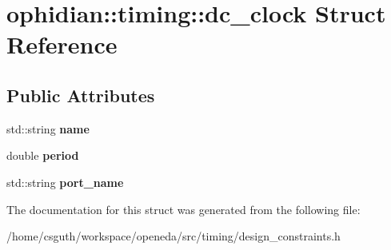 \hypertarget{structophidian_1_1timing_1_1dc__clock}{\section{ophidian\-:\-:timing\-:\-:dc\-\_\-clock Struct Reference}
\label{structophidian_1_1timing_1_1dc__clock}
}
\subsection*{Public Attributes}
\begin{DoxyCompactItemize}
\item 
\hypertarget{structophidian_1_1timing_1_1dc__clock_a2933fc825230693d445c4893e22c87bc}{std\-::string {\bfseries name}}\label{structophidian_1_1timing_1_1dc__clock_a2933fc825230693d445c4893e22c87bc}

\item 
\hypertarget{structophidian_1_1timing_1_1dc__clock_a7c381c2cc2bed0b2637022776538583c}{double {\bfseries period}}\label{structophidian_1_1timing_1_1dc__clock_a7c381c2cc2bed0b2637022776538583c}

\item 
\hypertarget{structophidian_1_1timing_1_1dc__clock_a1677647274c333dbb9f3e12c08c0d207}{std\-::string {\bfseries port\-\_\-name}}\label{structophidian_1_1timing_1_1dc__clock_a1677647274c333dbb9f3e12c08c0d207}

\end{DoxyCompactItemize}


The documentation for this struct was generated from the following file\-:\begin{DoxyCompactItemize}
\item 
/home/csguth/workspace/openeda/src/timing/design\-\_\-constraints.\-h\end{DoxyCompactItemize}
